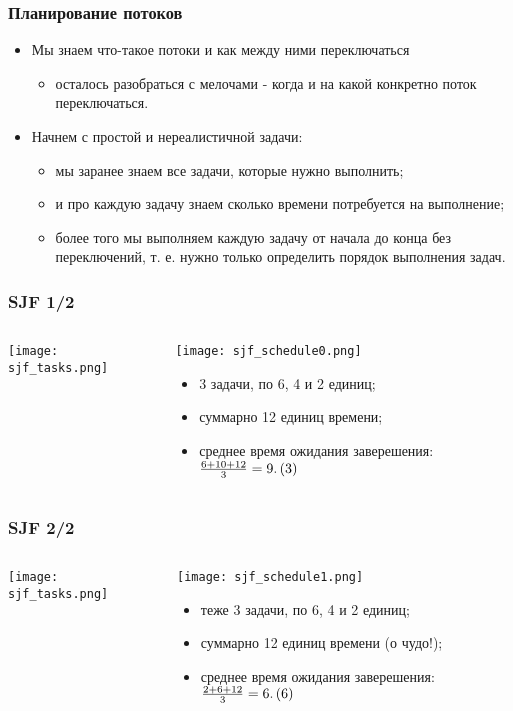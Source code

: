 \begin{frame}
\frametitle{Планирование потоков}
\begin{itemize}
  \item Мы знаем что-такое потоки и как между ними переключаться
  \begin{itemize}
    \item осталось разобраться с мелочами - когда и на какой конкретно поток
    переключаться.
  \end{itemize}
  \item Начнем с простой и нереалистичной задачи:
  \begin{itemize}
    \item мы заранее знаем все задачи, которые нужно выполнить;
    \item и про каждую задачу знаем сколько времени потребуется на выполнение;
    \item более того мы выполняем каждую задачу от начала до конца без
    переключений, т. е. нужно только определить порядок выполнения задач.
  \end{itemize}
\end{itemize}
\end{frame}

\begin{frame}
\frametitle{SJF 1/2}
\begin{columns}
  \begin{column}{0.5\linewidth}
    \texttt{[image: sjf\_tasks.png]}
  \end{column}
  \begin{column}{0.5\linewidth}
    \texttt{[image: sjf\_schedule0.png]}
    \begin{itemize}
      \item 3 задачи, по 6, 4 и 2 единиц;
      \item суммарно 12 единиц времени;
      \item среднее время ожидания заверешения:
      ${{6+10+12}\over{3}}=9.\left(3\right)$
    \end{itemize}
  \end{column}
\end{columns}
\end{frame}

\begin{frame}
\frametitle{SJF 2/2}
\begin{columns}
  \begin{column}{0.5\linewidth}
    \texttt{[image: sjf\_tasks.png]}
  \end{column}
  \begin{column}{0.5\linewidth}
    \texttt{[image: sjf\_schedule1.png]}
    \begin{itemize}
      \item теже 3 задачи, по 6, 4 и 2 единиц;
      \item суммарно 12 единиц времени (о чудо!);
      \item среднее время ожидания заверешения:
      ${{2+6+12}\over{3}}=6.\left(6\right)$
    \end{itemize}
  \end{column}
\end{columns}
\end{frame}

